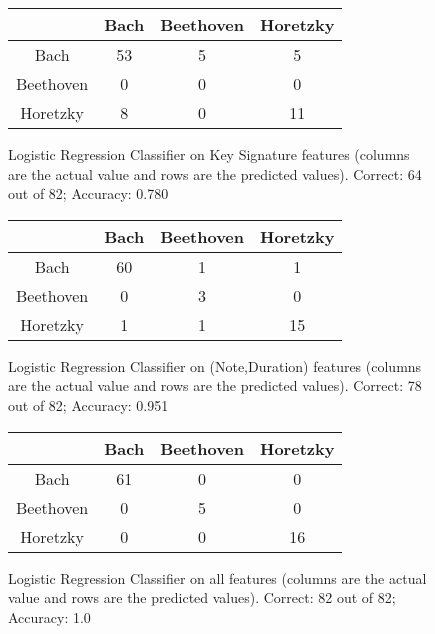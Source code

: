 \documentclass[10pt]{IEEEtran}
\begin{document}
\begin{figure}[!t]
  \begin{center}
    \begin{tabular}{c | c c c}
      & Bach  & Beethoven & Horetzky \\
      \hline
      Bach      & 53 & 5 & 5 \\
      Beethoven & 0  & 0 & 0 \\
      Horetzky  & 8  & 0 & 11
    \end{tabular}
  \end{center}
  \caption{
    Logistic Regression Classifier on Key Signature features (columns are the
    actual value and rows are the predicted values).
    Correct: 64 out of 82;
    Accuracy: 0.780
    \label{lrkey}
  }
\end{figure}

\begin{figure}[!t]
  \begin{center}
    \begin{tabular}{c | c c c}
      & Bach  & Beethoven & Horetzky \\
      \hline
      Bach      & 60 & 1 & 1 \\
      Beethoven & 0  & 3 & 0 \\
      Horetzky  & 1  & 1 & 15
    \end{tabular}
  \end{center}
  \caption{
    Logistic Regression Classifier on (Note,Duration) features (columns are the
    actual value and rows are the predicted values).
    Correct: 78 out of 82;
    Accuracy: 0.951
    \label{lrprim}
  }
\end{figure}

\begin{figure}[!t]
  \begin{center}
    \begin{tabular}{c | c c c}
      & Bach  & Beethoven & Horetzky \\
      \hline
      Bach      & 61 & 0 & 0 \\
      Beethoven & 0  & 5 & 0 \\
      Horetzky  & 0  & 0 & 16
    \end{tabular}
  \end{center}
  \caption{
    Logistic Regression Classifier on all features (columns are the
    actual value and rows are the predicted values).
    Correct: 82 out of 82;
    Accuracy: 1.0
    \label{lrall}
  }
\end{figure}
\end{document}
